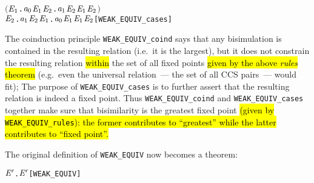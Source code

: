 \begin{itemize}
\begin{alltt}
   \ensuremath{(}\HOLSymConst{\HOLTokenForall{}}\ensuremath{\HOLBoundVar{E}\sb{\mathrm{1}}}. \ensuremath{\HOLFreeVar{a}\sb{\mathrm{0}}} \HOLTokenTransBegin\HOLSymConst{\ensuremath{\tau}}\HOLTokenTransEnd \ensuremath{\HOLBoundVar{E}\sb{\mathrm{1}}} \HOLSymConst{\HOLTokenImp{}} \HOLSymConst{\HOLTokenExists{}}\ensuremath{\HOLBoundVar{E}\sb{\mathrm{2}}}. \ensuremath{\HOLFreeVar{a}\sb{\mathrm{1}}} \HOLSymConst{\HOLTokenEPS} \ensuremath{\HOLBoundVar{E}\sb{\mathrm{2}}} \HOLSymConst{\HOLTokenConj{}} \ensuremath{\HOLBoundVar{E}\sb{\mathrm{1}}} \HOLSymConst{\HOLTokenWeakEQ} \ensuremath{\HOLBoundVar{E}\sb{\mathrm{2}}}\ensuremath{)} \HOLSymConst{\HOLTokenConj{}}
   \HOLSymConst{\HOLTokenForall{}}\ensuremath{\HOLBoundVar{E}\sb{\mathrm{2}}}. \ensuremath{\HOLFreeVar{a}\sb{\mathrm{1}}} \HOLTokenTransBegin\HOLSymConst{\ensuremath{\tau}}\HOLTokenTransEnd \ensuremath{\HOLBoundVar{E}\sb{\mathrm{2}}} \HOLSymConst{\HOLTokenImp{}} \HOLSymConst{\HOLTokenExists{}}\ensuremath{\HOLBoundVar{E}\sb{\mathrm{1}}}. \ensuremath{\HOLFreeVar{a}\sb{\mathrm{0}}} \HOLSymConst{\HOLTokenEPS} \ensuremath{\HOLBoundVar{E}\sb{\mathrm{1}}} \HOLSymConst{\HOLTokenConj{}} \ensuremath{\HOLBoundVar{E}\sb{\mathrm{1}}} \HOLSymConst{\HOLTokenWeakEQ} \ensuremath{\HOLBoundVar{E}\sb{\mathrm{2}}}\hfill{[WEAK_EQUIV_cases]}
\end{alltt}
\end{itemize}

The coinduction principle \texttt{WEAK_EQUIV_coind} says that any
bisimulation is contained in the resulting relation
(i.e.~it is the largest), but it does not constrain the resulting relation
\hl{within} the set of all fixed points \hl{given by the above
  \emph{rules} theorem}
(e.g.~even the universal relation~--- the set of all CCS
pairs~--- would fit); The
purpose of \texttt{WEAK_EQUIV_cases} is to
further assert that the resulting relation is indeed a
fixed point. Thus \texttt{WEAK_EQUIV_coind} and \texttt{WEAK_EQUIV_cases}
together make sure that bisimilarity is the greatest
fixed point \hl{(given by \texttt{WEAK_EQUIV_rules}):
the former contributes to ``greatest'' while the latter
contributes to ``fixed point''.} %

The original definition of \texttt{WEAK_EQUIV} now becomes a theorem:
\begin{alltt}
\HOLTokenTurnstile{}  \HOLSymConst{\HOLTokenWeakEQ} \ensuremath{\HOLFreeVar{E}\sp{\prime}} \HOLSymConst{\HOLTokenEquiv{}} \HOLSymConst{\HOLTokenExists{}}.   \ensuremath{\HOLFreeVar{E}\sp{\prime}} \HOLSymConst{\HOLTokenConj{}}  \hfill{[WEAK_EQUIV]}
\end{alltt}

